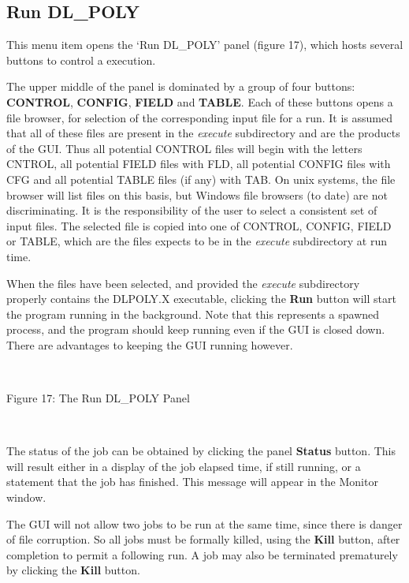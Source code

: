 \subsection{Run DL\_POLY}
This menu item opens the `Run DL\_POLY' panel (figure 17), which hosts
several buttons to control a \DD{} execution.

The upper middle of the panel is dominated by a group of four buttons:
{\bf CONTROL}, {\bf CONFIG}, {\bf FIELD} and {\bf TABLE}. Each of
these buttons opens a file browser, for selection of the corresponding
input file for a \DD{} run. It is assumed that all of these files are
present in the {\em execute} subdirectory and are the products of the
GUI. Thus all potential CONTROL files will begin with the letters
CNTROL, all potential FIELD files with FLD, all potential CONFIG files
with CFG and all potential TABLE files (if any) with TAB. On unix
systems, the file browser will list files on this basis, but Windows
file browsers (to date) are not discriminating. It is the
responsibility of the user to select a consistent set of input
files. The selected file is copied into one of CONTROL, CONFIG, FIELD
or TABLE, which are the files \DD{} expects to be in the {\em execute}
subdirectory at run time.

When the files have been selected, and provided the {\em execute}
subdirectory properly contains the DLPOLY.X executable, clicking the {\bf
Run} button will start the \DD{} program running in the background. Note
that this represents a spawned process, and the program should keep
running even if the GUI is closed down. There are advantages to keeping
the GUI running however.

~

\vskip 5mm
\centerline{}
\centerline{Figure 17: The Run DL\_POLY Panel}
\vskip 5mm

~

\noindent

The status of the job can be obtained by clicking the panel {\bf
Status} button. This will result either in a display of the job
elapsed time, if still running, or a statement that the job has
finished. This message will appear in the Monitor window. 

The GUI will not allow two jobs to be run at the same time, since
there is danger of file corruption. So all jobs must be formally
killed, using the {\bf Kill} button, after completion to permit a
following run. A job may also be terminated prematurely by clicking
the {\bf Kill} button.

